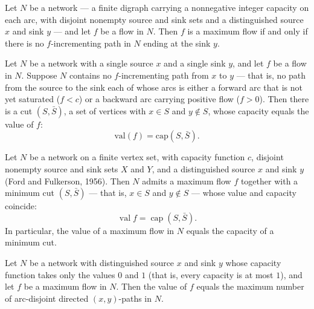 \begin{theorem}
\label{Networks.maxFlow_iff_no_incrementing_path}
Let $N$ be a network — a finite digraph carrying a nonnegative integer capacity on each
arc, with disjoint nonempty source and sink sets and a distinguished source $x$ and sink
$y$ — and let $f$ be a flow in $N$. Then $f$ is a maximum flow if and only if there is
no $f$-incrementing path in $N$ ending at the sink $y$.
\end{theorem}

\begin{theorem}
\label{Networks.exists_cut_of_no_incrementing_path}
\leanok
{}
Let $N$ be a network with a single source $x$ and a single sink $y$, and let $f$ be a
flow in $N$. Suppose $N$ contains no $f$-incrementing path from $x$ to $y$ — that is, no
path from the source to the sink each of whose arcs is either a forward arc that is not
yet saturated ($f < c$) or a backward arc carrying positive flow ($f > 0$). Then there
is a cut $(S,\bar S)$, a set of vertices with $x \in S$ and $y \notin S$, whose capacity
equals the value of $f$: \[ \mathrm{val}(f) = \mathrm{cap}(S,\bar S). \]
\end{theorem}

\begin{theorem}
\label{Networks.maxFlow_min_cut}
Let $N$ be a network on a finite vertex set, with capacity function $c$, disjoint
nonempty source and sink sets $X$ and $Y$, and a distinguished source $x$ and sink $y$
(Ford and Fulkerson, 1956). Then $N$ admits a maximum flow $f$ together with a minimum
cut $(S,\bar S)$ — that is, $x \in S$ and $y \notin S$ — whose value and capacity
coincide:
\[
\operatorname{val} f = \operatorname{cap}(S,\bar S).
\]
In particular, the value of a maximum flow in $N$ equals the capacity of a minimum cut.
\end{theorem}

\begin{theorem}
\label{Networks.unitCapacity_maxFlow_eq_arcDisjoint}
Let $N$ be a network with distinguished source $x$ and sink $y$ whose capacity function
takes only the values $0$ and $1$ (that is, every capacity is at most $1$), and let $f$
be a maximum flow in $N$. Then the value of $f$ equals the maximum number of
arc-disjoint directed $(x,y)$-paths in $N$.
\end{theorem}

